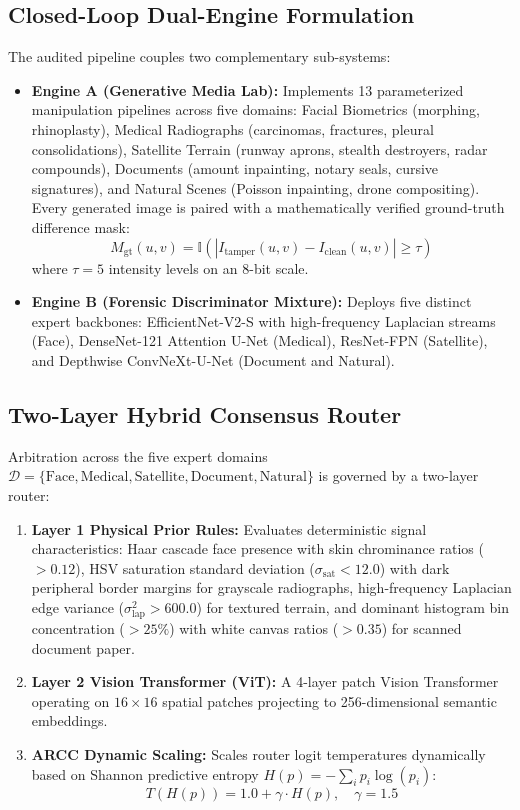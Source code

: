 \documentclass[conference]{IEEEtran}
\begin{document}
\subsection{Closed-Loop Dual-Engine Formulation}
The audited pipeline couples two complementary sub-systems:
\begin{itemize}
    \item \textbf{Engine A (Generative Media Lab):} Implements 13 parameterized manipulation pipelines across five domains: Facial Biometrics (morphing, rhinoplasty), Medical Radiographs (carcinomas, fractures, pleural consolidations), Satellite Terrain (runway aprons, stealth destroyers, radar compounds), Documents (amount inpainting, notary seals, cursive signatures), and Natural Scenes (Poisson inpainting, drone compositing). Every generated image is paired with a mathematically verified ground-truth difference mask:
    \begin{equation}
        M_{\text{gt}}(u,v) = \mathbb{I}\left( |I_{\text{tamper}}(u,v) - I_{\text{clean}}(u,v)| \ge \tau \right)
    \end{equation}
    where $\tau=5$ intensity levels on an 8-bit scale.
    \item \textbf{Engine B (Forensic Discriminator Mixture):} Deploys five distinct expert backbones: EfficientNet-V2-S with high-frequency Laplacian streams (Face), DenseNet-121 Attention U-Net (Medical), ResNet-FPN (Satellite), and Depthwise ConvNeXt-U-Net (Document and Natural).
\end{itemize}

\subsection{Two-Layer Hybrid Consensus Router}
Arbitration across the five expert domains $\mathcal{D} = \{\text{Face}, \text{Medical}, \text{Satellite}, \text{Document}, \text{Natural}\}$ is governed by a two-layer router:
\begin{enumerate}
    \item \textbf{Layer 1 Physical Prior Rules:} Evaluates deterministic signal characteristics: Haar cascade face presence with skin chrominance ratios ($> 0.12$), HSV saturation standard deviation ($\sigma_{\text{sat}} < 12.0$) with dark peripheral border margins for grayscale radiographs, high-frequency Laplacian edge variance ($\sigma_{\text{lap}}^2 > 600.0$) for textured terrain, and dominant histogram bin concentration ($> 25\%$) with white canvas ratios ($> 0.35$) for scanned document paper.
    \item \textbf{Layer 2 Vision Transformer (ViT):} A 4-layer patch Vision Transformer operating on $16 \times 16$ spatial patches projecting to 256-dimensional semantic embeddings.
    \item \textbf{ARCC Dynamic Scaling:} Scales router logit temperatures dynamically based on Shannon predictive entropy $H(p) = -\sum_i p_i \log(p_i)$:
    \begin{equation}
        T(H(p)) = 1.0 + \gamma \cdot H(p), \quad \gamma = 1.5
    \end{equation}
\end{enumerate}
\end{document}
